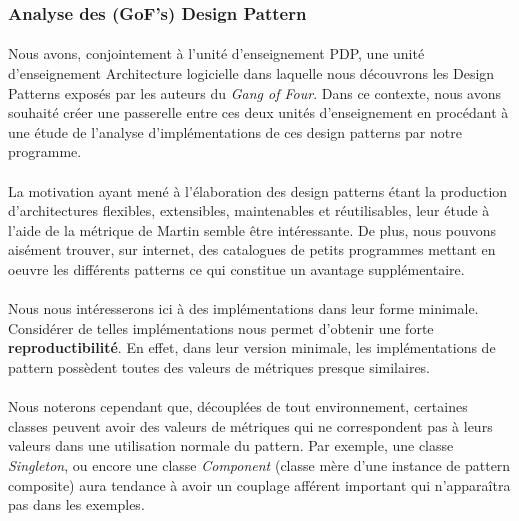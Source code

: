 \documentclass{scrartcl}
\begin{document}
    \subsubsection{Analyse des (GoF's) Design Pattern}
    \paragraph{}Nous avons, conjointement à l'unité d'enseignement PDP, une unité d'enseignement Architecture logicielle dans laquelle nous découvrons les Design Patterns exposés par les auteurs du \emph{Gang of Four}\cite{GoF:1994}. Dans ce contexte, nous avons souhaité créer une passerelle entre ces deux unités d'enseignement en procédant à une étude de l'analyse d'implémentations de ces design patterns par notre programme.

    \paragraph{}La motivation ayant mené à l'élaboration des design patterns étant la production d'architectures flexibles, extensibles, maintenables et réutilisables, leur étude à l'aide de la métrique de Martin semble être intéressante. De plus, nous pouvons aisément trouver, sur internet, des catalogues de petits programmes mettant en oeuvre les différents patterns ce qui constitue un avantage supplémentaire. 

    \paragraph{}Nous nous intéresserons ici à des implémentations dans leur forme minimale. Considérer de telles implémentations nous permet d'obtenir une forte \textbf{reproductibilité}. En effet, dans leur version minimale, les implémentations de pattern possèdent toutes des valeurs de métriques presque similaires.

    \paragraph{}Nous noterons cependant que, découplées de tout environnement, certaines classes peuvent avoir des valeurs de métriques qui ne correspondent pas à leurs valeurs dans une utilisation normale du pattern. Par exemple, une classe \emph{Singleton}, ou encore une classe \emph{Component} (classe mère d'une instance de pattern composite) aura tendance à avoir un couplage afférent important qui n’apparaîtra pas dans les exemples. 
    
\end{document}
